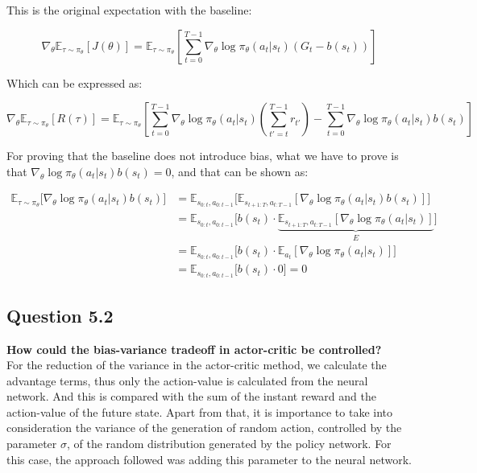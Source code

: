 \documentclass[12pt]{article}
\begin{document}
This is the original expectation with the baseline:

\begin{equation}
    \nabla_\theta \mathbb{E}_{\tau \sim \pi_\theta}[J(\theta)] =
\mathbb{E}_{\tau \sim \pi_\theta} \left[ \sum_{t=0}^{T-1} \nabla_\theta \log
\pi_\theta(a_t|s_t) \left(G_t - b(s_t)\right) \right]
\end{equation}

Which can be expressed as:

\begin{equation}
    \nabla_\theta \mathbb{E}_{\tau \sim \pi_\theta}[R(\tau)] =
\mathbb{E}_{\tau \sim \pi_\theta} \left[ \sum_{t=0}^{T-1} \nabla_\theta \log
\pi_\theta(a_t|s_t) \left(\sum_{t'=t}^{T-1}r_{t'}\right) - \sum_{t=0}^{T-1}
\nabla_\theta \log \pi_\theta(a_t|s_t) b(s_t) \right]
\end{equation}

For proving that the baseline does not introduce bias, what we have to prove is that $\nabla_\theta \log \pi_\theta(a_t|s_t) b(s_t) = 0$, and that can be shown as:

\begin{align}
\mathbb{E}_{\tau \sim \pi_\theta}\Big[\nabla_\theta \log \pi_\theta(a_t|s_t) b(s_t)\Big] &=  \mathbb{E}_{s_{0:t},a_{0:t-1}}\Big[ \mathbb{E}_{s_{t+1:T},a_{t:T-1}} [\nabla_\theta \log \pi_\theta(a_t|s_t) b(s_t)]\Big] \\
&= \mathbb{E}_{s_{0:t},a_{0:t-1}}\Big[ b(s_t) \cdot \underbrace{\mathbb{E}_{s_{t+1:T},a_{t:T-1}} [\nabla_\theta \log \pi_\theta(a_t|s_t)]}_{E}\Big] \\
&= \mathbb{E}_{s_{0:t},a_{0:t-1}}\Big[ b(s_t) \cdot \mathbb{E}_{a_t} [\nabla_\theta \log \pi_\theta(a_t|s_t)]\Big] \\
&= \mathbb{E}_{s_{0:t},a_{0:t-1}}\Big[ b(s_t) \cdot 0 \Big] = 0
\end{align}

\subsection{Question 5.2}
\textbf{How could the bias-variance tradeoff in actor-critic be controlled?}\\

For the reduction of the variance in the actor-critic method, we calculate the advantage terms, thus only the action-value is calculated from the neural network. And this is compared with the sum of the instant reward and the action-value of the future state. Apart from that, it is importance to take into consideration the variance of the generation of random action, controlled by the parameter $\sigma$, of the random distribution generated by the policy network. For this case, the approach followed was adding this parameter to the neural network.
\end{document}
